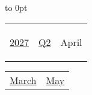 \vbox to 0pt{}


\pagebreak
{\noindent\Large\renewcommand{\arraystretch}{\myNumArrayStretch}\begin{tabular}{|l|l|l}
\hyperlink{2027}{2027} & \hyperlink{Q2}{Q2} & \hypertarget{April}{April}
\end{tabular}\hfill%
\begin{tabular}{r|r@{}}
\hyperlink{March}{March} & \hyperlink{May}{May}
\end{tabular}}
\myLineThick\medskip

{%

\setlength{\tabcolsep}{\myLenTabColSep}%
%
\begin{tabularx}{\linewidth}{|l!{\vrule width \myLenLineThicknessThick}*{7}{@{}X@{}|}}
  

\end{tabularx}}

